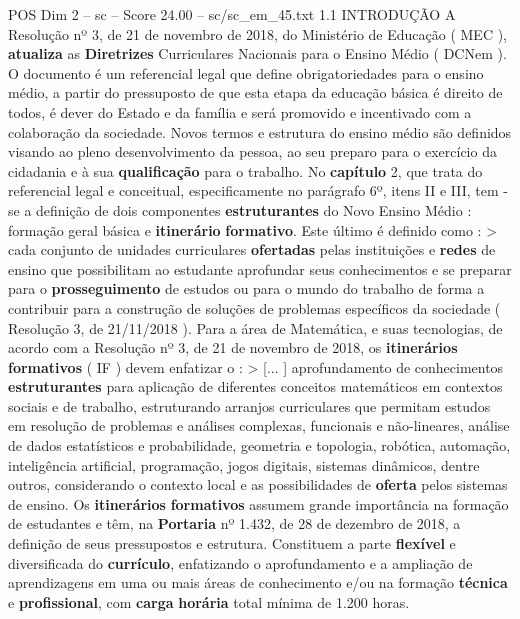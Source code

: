 \begin{textsample}{POS Dim 2 – sc – Score 24.00 – sc/sc\_em\_45.txt}  \label{ex:f2_pos_007}
1.1 INTRODUÇÃO A Resolução nº 3, de 21 de novembro de 2018, do Ministério de Educação ( MEC ), \textbf{atualiza} as \textbf{Diretrizes} Curriculares Nacionais para o Ensino Médio ( DCNem ).
O documento é um referencial legal que define obrigatoriedades para o ensino médio, a partir do pressuposto de que esta etapa da educação básica é direito de todos, é dever do Estado e da família e será promovido e incentivado com a colaboração da sociedade.
Novos termos e estrutura do ensino médio são definidos visando ao pleno desenvolvimento da pessoa, ao seu preparo para o exercício da cidadania e à sua \textbf{qualificação} para o trabalho.
No \textbf{capítulo} 2, que trata do referencial legal e conceitual, especificamente no parágrafo 6º, itens II e III, tem -se a definição de dois componentes \textbf{estruturantes} do Novo Ensino Médio : formação geral básica e \textbf{itinerário} \textbf{formativo}.
Este último é definido como : > cada conjunto de unidades curriculares \textbf{ofertadas} pelas instituições e \textbf{redes} de ensino que possibilitam ao estudante aprofundar seus conhecimentos e se preparar para o \textbf{prosseguimento} de estudos ou para o mundo do trabalho de forma a contribuir para a construção de soluções de problemas específicos da sociedade ( Resolução 3, de 21/11/2018 ).
Para a área de Matemática, e suas tecnologias, de acordo com a Resolução nº 3, de 21 de novembro de 2018, os \textbf{itinerários} \textbf{formativos} ( IF ) devem enfatizar o : > [... ] aprofundamento de conhecimentos \textbf{estruturantes} para aplicação de diferentes conceitos matemáticos em contextos sociais e de trabalho, estruturando arranjos curriculares que permitam estudos em resolução de problemas e análises complexas, funcionais e não-lineares, análise de dados estatísticos e probabilidade, geometria e topologia, robótica, automação, inteligência artificial, programação, jogos digitais, sistemas dinâmicos, dentre outros, considerando o contexto local e as possibilidades de \textbf{oferta} pelos sistemas de ensino.
Os \textbf{itinerários} \textbf{formativos} assumem grande importância na formação de estudantes e têm, na \textbf{Portaria} nº 1.432, de 28 de dezembro de 2018, a definição de seus pressupostos e estrutura.
Constituem a parte \textbf{flexível} e diversificada do \textbf{currículo}, enfatizando o aprofundamento e a ampliação de aprendizagens em uma ou mais áreas de conhecimento e/ou na formação \textbf{técnica} e \textbf{profissional}, com \textbf{carga} \textbf{horária} total mínima de 1.200 horas.

\end{textsample}
